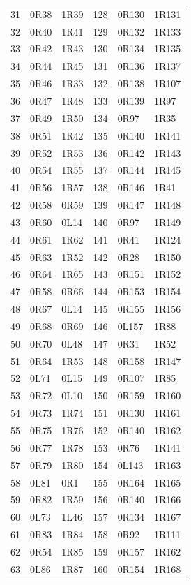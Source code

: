 {\begin{longtable}{@{}rll@{\qquad}rll@{}}
31 & 0R38 & 1R39 & 128 & 0R130 & 1R131\\
32 & 0R40 & 1R41 & 129 & 0R132 & 1R133\\
33 & 0R42 & 1R43 & 130 & 0R134 & 1R135\\
34 & 0R44 & 1R45 & 131 & 0R136 & 1R137\\
35 & 0R46 & 1R33 & 132 & 0R138 & 1R107\\
36 & 0R47 & 1R48 & 133 & 0R139 & 1R97\\
37 & 0R49 & 1R50 & 134 & 0R97 & 1R35\\
38 & 0R51 & 1R42 & 135 & 0R140 & 1R141\\
39 & 0R52 & 1R53 & 136 & 0R142 & 1R143\\
40 & 0R54 & 1R55 & 137 & 0R144 & 1R145\\
41 & 0R56 & 1R57 & 138 & 0R146 & 1R41\\
42 & 0R58 & 0R59 & 139 & 0R147 & 1R148\\
43 & 0R60 & 0L14 & 140 & 0R97 & 1R149\\
44 & 0R61 & 1R62 & 141 & 0R41 & 1R124\\
45 & 0R63 & 1R52 & 142 & 0R28 & 1R150\\
46 & 0R64 & 1R65 & 143 & 0R151 & 1R152\\
47 & 0R58 & 0R66 & 144 & 0R153 & 1R154\\
48 & 0R67 & 0L14 & 145 & 0R155 & 1R156\\
49 & 0R68 & 0R69 & 146 & 0L157 & 1R88\\
50 & 0R70 & 0L48 & 147 & 0R31 & 1R52\\
51 & 0R64 & 1R53 & 148 & 0R158 & 1R147\\
52 & 0L71 & 0L15 & 149 & 0R107 & 1R85\\
53 & 0R72 & 0L10 & 150 & 0R159 & 1R160\\
54 & 0R73 & 1R74 & 151 & 0R130 & 1R161\\
55 & 0R75 & 1R76 & 152 & 0R140 & 1R162\\
56 & 0R77 & 1R78 & 153 & 0R76 & 1R141\\
57 & 0R79 & 1R80 & 154 & 0L143 & 1R163\\
58 & 0L81 & 0R1 & 155 & 0R164 & 1R165\\
59 & 0R82 & 1R59 & 156 & 0R140 & 1R166\\
60 & 0L73 & 1L46 & 157 & 0R134 & 1R167\\
61 & 0R83 & 1R84 & 158 & 0R92 & 1R111\\
62 & 0R54 & 1R85 & 159 & 0R157 & 1R162\\
63 & 0L86 & 1R87 & 160 & 0R154 & 1R168\\

\end{longtable}}
